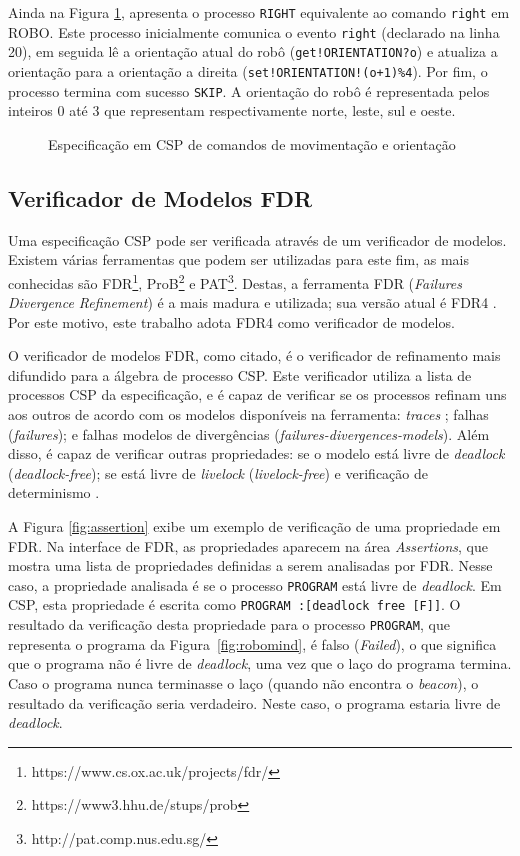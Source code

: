 Ainda na Figura \ref{fig:model2}, apresenta o processo \texttt{RIGHT} equivalente ao comando \texttt{right} em ROBO. Este processo inicialmente comunica o evento \texttt{right} (declarado na linha 20), em seguida lê a orientação atual do robô (\texttt{get!ORIENTATION?o}) e atualiza a orientação para a orientação a direita  (\texttt{set!ORIENTATION!(o+1)\%4}). Por fim, o processo termina com sucesso \texttt{SKIP}. A orientação do robô é representada pelos inteiros 0 até 3 que representam respectivamente norte, leste, sul e oeste. 

\begin{figure}[h]
\caption{Especificação em CSP de comandos de movimentação e orientação}

\label{fig:model2}
\end{figure}

\subsection{Verificador de Modelos FDR}

Uma especificação CSP pode ser verificada através de um verificador de modelos. Existem várias ferramentas que podem ser utilizadas para este fim, as mais conhecidas são FDR\footnote[4]{https://www.cs.ox.ac.uk/projects/fdr/}, ProB\footnote[5]{https://www3.hhu.de/stups/prob} e PAT\footnote[6]{http://pat.comp.nus.edu.sg/}. Destas, a ferramenta FDR (\textit{Failures Divergence Refinement}) é a mais madura e utilizada; sua versão atual é FDR4 \cite{Gibson}. Por este motivo, este trabalho adota FDR4 como verificador de modelos.

O verificador de modelos FDR, como citado, é o verificador de refinamento mais difundido para a álgebra de processo CSP. Este verificador utiliza a lista de processos CSP da especificação, e é capaz de verificar se os processos refinam uns aos outros de acordo com os modelos disponíveis na ferramenta: \textit{traces} ; falhas (\textit{failures}); e falhas modelos de divergências (\textit{failures-divergences-models}). Além disso, é capaz de verificar outras propriedades: se o modelo está livre de \textit{deadlock} (\textit{deadlock-free}); se está livre de \textit{livelock} (\textit{livelock-free}) e verificação de determinismo \cite{Gibson}.

A Figura \ref{fig:assertion} exibe um exemplo de verificação de uma propriedade em FDR. Na interface de FDR, as propriedades aparecem na área \textit{Assertions}, que mostra uma lista de propriedades definidas a serem analisadas por FDR. Nesse caso, a propriedade analisada é se o processo \texttt{PROGRAM} está livre de  \textit{deadlock}. Em CSP, esta propriedade é escrita como \texttt{PROGRAM :[deadlock free [F]]}. O resultado da verificação desta propriedade para o processo \texttt{PROGRAM}, que representa o programa da Figura~\ref{fig:robomind}, é falso (\textit{Failed}), o que significa que o programa não é livre de \textit{deadlock}, uma vez que o laço do programa termina. Caso o programa nunca terminasse o laço (quando não encontra o \textit{beacon}), o resultado da verificação seria verdadeiro. Neste caso, o programa estaria livre de \textit{deadlock}.

